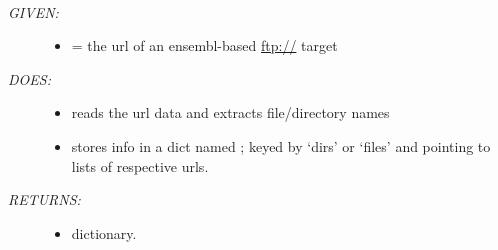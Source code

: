 \documentclass[letterpaper,10pt,english]{sphinxmanual}
\begin{document}

\begin{fulllineitems}
\label{code:gfunc.ensembl_data.web_ls}~\begin{description}
\item[{\emph{GIVEN:}}] \leavevmode\begin{itemize}
\item {} 
 = the url of an ensembl-based \href{ftp://}{ftp://} target

\end{itemize}

\item[{\emph{DOES:}}] \leavevmode\begin{itemize}
\item {} 
reads the url data and extracts file/directory names

\item {} 
stores info in a dict named ; keyed by `dirs' or `files' and pointing to lists of respective urls.

\end{itemize}

\item[{\emph{RETURNS:}}] \leavevmode\begin{itemize}
\item {} 
 dictionary.

\end{itemize}

\end{description}

\end{fulllineitems}

\end{document}
